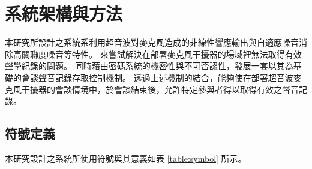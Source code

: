 \chapter{系統架構與方法}

    本研究所設計之系統系利用超音波對麥克風造成的非線性響應輸出與自適應噪音消除高關聯度噪音等特性。
來嘗試解決在部署麥克風干擾器的場域裡無法取得有效聲學紀錄的問題。
同時藉由密碼系統的機密性與不可否認性，發展一套以其為基礎的會談聲音記錄存取控制機制。
透過上述機制的結合，能夠使在部署超音波麥克風干擾器的會談情境中，於會談結束後，允許特定參與者得以取得有效之聲音記錄。


\section{符號定義}

    本研究設計之系統所使用符號與其意義如表 \ref{table:symbol} 所示。


